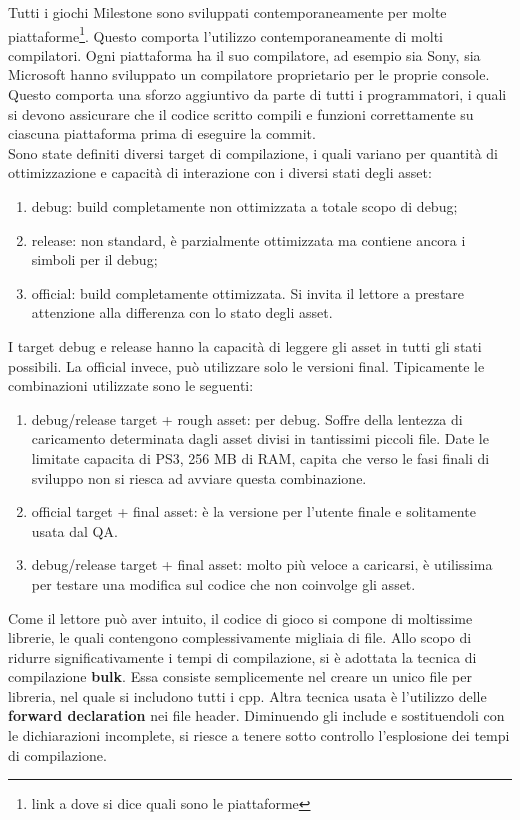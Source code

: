 Tutti i giochi Milestone sono sviluppati contemporaneamente per molte piattaforme\footnote{link a dove si dice quali sono le piattaforme}. Questo comporta l'utilizzo contemporaneamente di molti compilatori. Ogni piattaforma ha il suo compilatore, ad esempio sia Sony, sia Microsoft hanno sviluppato un compilatore proprietario per le proprie console. Questo comporta una sforzo aggiuntivo da parte di tutti i programmatori, i quali si devono assicurare che il codice scritto compili e funzioni correttamente su ciascuna piattaforma prima di eseguire la commit.\\

Sono state definiti diversi target di compilazione, i quali variano per quantità di ottimizzazione e capacità di interazione con i diversi stati degli asset:
\begin{enumerate}
	\item debug: build completamente non ottimizzata a totale scopo di debug;
	\item release: non standard, è parzialmente ottimizzata ma contiene ancora i simboli per il debug;
	\item official: build completamente ottimizzata. Si invita il lettore a prestare attenzione alla differenza con lo stato  degli asset.
\end{enumerate}

I target debug e release hanno la capacità di leggere gli asset in tutti gli stati possibili. La official invece, può utilizzare solo le versioni final. Tipicamente le combinazioni utilizzate sono le seguenti:
\begin{enumerate}
	\item debug/release target + rough asset: per debug. Soffre della lentezza di caricamento determinata dagli asset divisi in tantissimi piccoli file. Date le limitate capacita di PS3\textsuperscript{\textregistered}, 256 MB di RAM, capita che verso le fasi finali di sviluppo non si riesca ad avviare questa combinazione.
	\item official target + final asset: è la versione per l'utente finale e solitamente usata dal QA.
	\item debug/release target + final asset: molto più veloce a caricarsi, è utilissima per testare una modifica sul codice che non coinvolge gli asset.
\end{enumerate}

Come il lettore può aver intuito, il codice di gioco si compone di moltissime librerie, le quali contengono complessivamente migliaia di file. Allo scopo di ridurre significativamente i tempi di compilazione, si è adottata la tecnica di compilazione \textbf{bulk}. Essa consiste semplicemente nel creare un unico file per libreria, nel quale si includono tutti i cpp. Altra tecnica usata è l'utilizzo delle \textbf{forward declaration} nei file header. Diminuendo gli include e sostituendoli con le dichiarazioni incomplete, si riesce a tenere sotto controllo l'esplosione dei tempi di compilazione.\\

